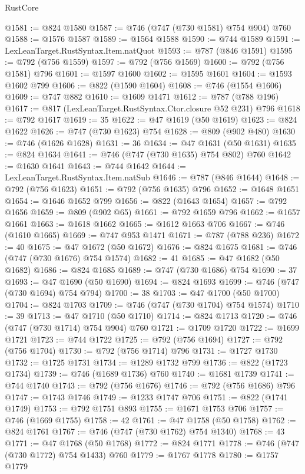 \begin{lexlean}{RustCore}
\begin{coremodule}
@1581 := @824 @1580
@1587 := @746 (@747 (@730 @1581) @754 @904) @760
@1588 := @1576 @1587
@1589 := @1564 @1588
@1590 := @744 @1589
@1591 := LexLeanTarget.RustSyntax.Item.natQuot
@1593 := @787 (@846 @1591)
@1595 := @792 (@756 @1559)
@1597 := @792 (@756 @1569)
@1600 := @792 (@756 @1581) @796
@1601 := @1597 @1600
@1602 := @1595 @1601
@1604 := @1593 @1602 @799
@1606 := @822 (@1590 @1604)
@1608 := @746 (@1554 @1606)
@1609 := @747 @882
@1610 := @1609 @1471
@1612 := @787 (@788 @196)
@1617 := @817 (LexLeanTarget.RustSyntax.Ctor.closure @52 @231) @796
@1618 := @792 @1617
@1619 := 35
@1622 := @47 @1619 (@50 @1619)
@1623 := @824 @1622
@1626 := @747 (@730 @1623) @754
@1628 := @809 (@902 @480)
@1630 := @746 (@1626 @1628)
@1631 := 36
@1634 := @47 @1631 (@50 @1631)
@1635 := @824 @1634
@1641 := @746 (@747 (@730 @1635) @754 @802) @760
@1642 := @1630 @1641
@1643 := @744 @1642
@1644 := LexLeanTarget.RustSyntax.Item.natSub
@1646 := @787 (@846 @1644)
@1648 := @792 (@756 @1623)
@1651 := @792 (@756 @1635) @796
@1652 := @1648 @1651
@1654 := @1646 @1652 @799
@1656 := @822 (@1643 @1654)
@1657 := @792 @1656
@1659 := @809 (@902 @65)
@1661 := @792 @1659 @796
@1662 := @1657 @1661
@1663 := @1618 @1662
@1665 := @1612 @1663 @706
@1667 := @746 (@1610 @1665)
@1669 := @747 @953 @1471
@1671 := @787 (@788 @236)
@1672 := 40
@1675 := @47 @1672 (@50 @1672)
@1676 := @824 @1675
@1681 := @746 (@747 (@730 @1676) @754 @1574)
@1682 := 41
@1685 := @47 @1682 (@50 @1682)
@1686 := @824 @1685
@1689 := @747 (@730 @1686) @754
@1690 := 37
@1693 := @47 @1690 (@50 @1690)
@1694 := @824 @1693
@1699 := @746 (@747 (@730 @1694) @754 @794)
@1700 := 38
@1703 := @47 @1700 (@50 @1700)
@1704 := @824 @1703
@1709 := @746 (@747 (@730 @1704) @754 @1574)
@1710 := 39
@1713 := @47 @1710 (@50 @1710)
@1714 := @824 @1713
@1720 := @746 (@747 (@730 @1714) @754 @904) @760
@1721 := @1709 @1720
@1722 := @1699 @1721
@1723 := @744 @1722
@1725 := @792 (@756 @1694)
@1727 := @792 (@756 @1704)
@1730 := @792 (@756 @1714) @796
@1731 := @1727 @1730
@1732 := @1725 @1731
@1734 := @1289 @1732 @799
@1736 := @822 (@1723 @1734)
@1739 := @746 (@1689 @1736) @760
@1740 := @1681 @1739
@1741 := @744 @1740
@1743 := @792 (@756 @1676)
@1746 := @792 (@756 @1686) @796
@1747 := @1743 @1746
@1749 := @1233 @1747 @706
@1751 := @822 (@1741 @1749)
@1753 := @792 @1751 @893
@1755 := @1671 @1753 @706
@1757 := @746 (@1669 @1755)
@1758 := 42
@1761 := @47 @1758 (@50 @1758)
@1762 := @824 @1761
@1767 := @746 (@747 (@730 @1762) @754 @1340)
@1768 := 43
@1771 := @47 @1768 (@50 @1768)
@1772 := @824 @1771
@1778 := @746 (@747 (@730 @1772) @754 @1433) @760
@1779 := @1767 @1778
@1780 := @1757 @1779

\end{coremodule}
\end{lexlean}
